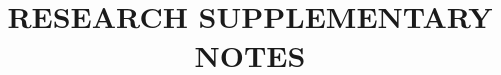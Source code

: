 \documentclass[leqno,11pt]{report}
\newcommand{\1}{\mathbbm{1}}
\theoremstyle{break}
\theoremstyle{newstyle}
\theoremstyle{newstyle}
\theoremstyle{newstyle4}
\theoremstyle{newstyle}
\theoremstyle{newstyle4}
\theoremstyle{newstyle}
\theoremstyle{newstyle}
\theoremstyle{newstyle2}
\theoremstyle{newstyle3}
\theoremstyle{newstyle2}
\theoremstyle{newstyle2}
\theoremstyle{newstyle2}
\theoremstyle{newstyle}
\theoremstyle{newstyle}
\theoremstyle{newstyle4}
\theoremstyle{newstyle2}
\theoremstyle{newstyle3}
\theoremstyle{newstyle2}
\theoremstyle{newstyle2}
\theoremstyle{newstyle2.5}
\theoremstyle{newstyle2}
\theoremstyle{newstyle2}
\theoremstyle{newstyle2}
\theoremstyle{newstyle2}
\theoremstyle{named}
\theoremstyle{named2}
\theoremstyle{named3}
\begin{document}
\def\dnicefrac#1#2{ 
	\raise.5ex\hbox{$#1$} 
	\kern-.1em/\kern-.15em 
	\lower.25ex\hbox{$#2$}}
\title{RESEARCH SUPPLEMENTARY NOTES}

\begin{onehalfspacing}

\def\dnicefrac#1#2{ 
	\raise.5ex\hbox{$#1$} 
	\kern-.1em/\kern-.15em  t
	\lower.25ex\hbox{$#2$}}
	
\newcommand*\widefbox[1]{\fbox{\hspace{2em}#1\hspace{2em}}}
	


\tableofcontents

\newpage




\end{onehalfspacing}
\end{document}

